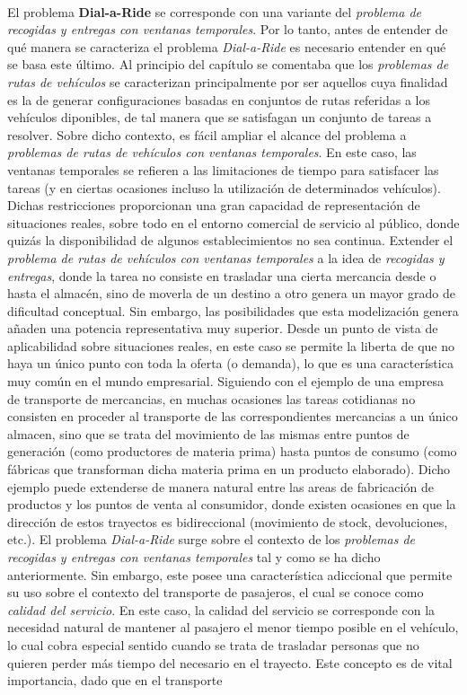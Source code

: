 \documentclass{subfiles}
\begin{document}
      \paragraph{}
      El problema \textbf{Dial-a-Ride} se corresponde con una variante del \emph{problema de recogidas y entregas con ventanas temporales}. Por lo tanto, antes de entender de qué manera se caracteriza el problema \emph{Dial-a-Ride} es necesario entender en qué se basa este último. Al principio del capítulo se comentaba que los \emph{problemas de rutas de vehículos} se caracterizan principalmente por ser aquellos cuya finalidad es la de generar configuraciones basadas en conjuntos de rutas referidas a los vehículos diponibles, de tal manera que se satisfagan un conjunto de tareas a resolver. Sobre dicho contexto, es fácil ampliar el alcance del problema a \emph{problemas de rutas de vehículos con ventanas temporales}. En este caso, las ventanas temporales se refieren a las limitaciones de tiempo para satisfacer las tareas (y en ciertas ocasiones incluso la utilización de determinados vehículos). Dichas restricciones proporcionan una gran capacidad de representación de situaciones reales, sobre todo en el entorno comercial de servicio al público, donde quizás la disponibilidad de algunos establecimientos no sea continua. Extender el \emph{problema de rutas de vehículos con ventanas temporales} a la idea de \emph{recogidas y entregas}, donde la tarea no consiste en trasladar una cierta mercancia desde o hasta el almacén, sino de moverla de un destino a otro genera un mayor grado de dificultad conceptual. Sin embargo, las posibilidades que esta modelización genera añaden una potencia representativa muy superior. Desde un punto de vista de aplicabilidad sobre situaciones reales, en este caso se permite la liberta de que no haya un único punto con toda la oferta (o demanda), lo que es una característica muy común en el mundo empresarial. Siguiendo con el ejemplo de una empresa de transporte de mercancias, en muchas ocasiones las tareas cotidianas no consisten en proceder al transporte de las correspondientes mercancias a un único almacen, sino que se trata del movimiento de las mismas entre puntos de generación (como productores de materia prima) hasta puntos de consumo (como fábricas que transforman dicha materia prima en un producto elaborado). Dicho ejemplo puede extenderse de manera natural entre las areas de fabricación de productos y los puntos de venta al consumidor, donde existen ocasiones en que la dirección de estos trayectos es bidireccional (movimiento de stock, devoluciones, etc.). El problema \emph{Dial-a-Ride} surge sobre el contexto de los \emph{problemas de recogidas y entregas con ventanas temporales} tal y como se ha dicho anteriormente. Sin embargo, este posee una característica adiccional que permite su uso sobre el contexto del transporte de pasajeros, el cual se conoce como \emph{calidad del servicio}. En este caso, la calidad del servicio se corresponde con la necesidad natural de mantener al pasajero el menor tiempo posible en el vehículo, lo cual cobra especial sentido cuando se trata de trasladar personas que no quieren perder más tiempo del necesario en el trayecto. Este concepto es de vital importancia, dado que en el transporte 
\end{document}
